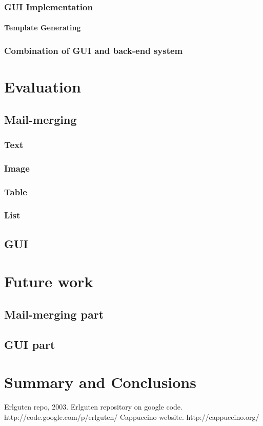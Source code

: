 \documentclass{report}
\begin{document}
  

\subsection{GUI Implementation}
\subsubsection{Template Generating}
\subsection{Combination of GUI and back-end system}

\chapter{Evaluation}
\section{Mail-merging}
\subsection{Text}
\subsection{Image}
\subsection{Table}
\subsection{List}
\section{GUI}

\chapter{Future work}
\section{Mail-merging part}
\section{GUI part}

\chapter{Summary and Conclusions}

\begin{thebibliography}{9}
Erlguten repo, 2003. Erlguten repository on google code. http://code.google.com/p/erlguten/
 Cappuccino website. http://cappuccino.org/
\end{thebibliography}
\end{document}
